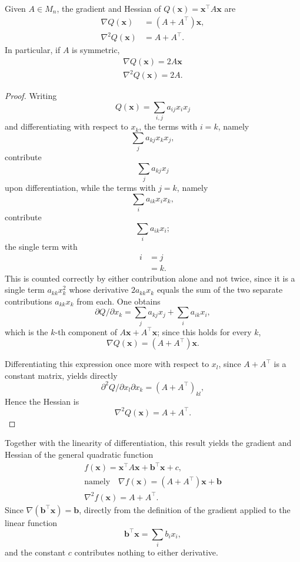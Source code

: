 \begin{theorem}
Given $A \in M_n$, the gradient and Hessian of $Q(\mathbf{x}) = \mathbf{x}^{\top}A\mathbf{x}$ are
\[
\begin{aligned}
\nabla Q(\mathbf{x}) &= (A + A^{\top})\mathbf{x}, \\[0.5em]
\nabla^2 Q(\mathbf{x}) &= A + A^{\top}.
\end{aligned}
\]
In particular, if $A$ is symmetric,
\[
\begin{gathered}
\nabla Q(\mathbf{x}) = 2A\mathbf{x} \\[0.5em]
\nabla^2 Q(\mathbf{x}) = 2A.
\end{gathered}
\]

\end{theorem}

\begin{proof}
Writing \[
Q(\mathbf{x}) = \sum_{i,j} a_{ij} x_i x_j
\] and differentiating with respect to $x_k$, the terms with $i=k$, namely \[
\sum_j a_{kj}x_k x_j,
\] contribute \[
\sum_j a_{kj} x_j
\] upon differentiation, while the terms with $j=k$, namely \[
\sum_i a_{ik}x_ix_k,
\] contribute \[
\sum_i a_{ik} x_i;
\] the single term with
\[
\begin{aligned}
i &= j \\
&= k.
\end{aligned}
\]
This is counted correctly by either contribution alone and not twice, since it is a single term $a_{kk}x_k^2$ whose derivative $2a_{kk}x_k$ equals the sum of the two separate contributions $a_{kk}x_k$ from each. One obtains \[
\partial Q / \partial x_k = \sum_j a_{kj}x_j + \sum_i a_{ik}x_i,
\] which is the $k$-th component of $A\mathbf{x} + A^{\top}\mathbf{x}$; since this holds for every $k$,
\[
\nabla Q(\mathbf{x}) = (A+A^{\top})\mathbf{x}.
\]

Differentiating this expression once more with respect to $x_l$, since $A+A^{\top}$ is a constant matrix, yields directly
\[
\partial^2 Q/\partial x_l \partial x_k = (A+A^{\top})_{kl},
\]
Hence the Hessian is
\[
\nabla^2 Q(\mathbf{x}) = A+A^{\top}.
\]

\end{proof}

Together with the linearity of differentiation, this result yields the gradient and Hessian of the general quadratic function
\[
\begin{gathered}
f(\mathbf{x}) = \mathbf{x}^{\top}A\mathbf{x} + \mathbf{b}^{\top}\mathbf{x} + c, \\[0.5em]
\text{namely}\quad \nabla f(\mathbf{x}) = (A+A^{\top})\mathbf{x} + \mathbf{b} \\[0.5em]
\nabla^2 f(\mathbf{x}) = A + A^{\top}.
\end{gathered}
\]
Since $\nabla(\mathbf{b}^{\top}\mathbf{x}) = \mathbf{b}$, directly from the definition of the gradient applied to the linear function \[
\mathbf{b}^{\top}\mathbf{x} = \sum_i b_i x_i,
\] and the constant $c$ contributes nothing to either derivative.

